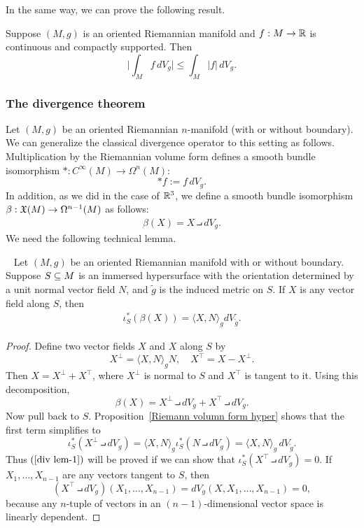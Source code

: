 In the same way, we can prove the following result.
\begin{proposition}
Suppose $(M,g)$ is an oriented Riemannian manifold and $f:M\to\mathbb{R}$ is continuous and compactly supported. Then
\[\Big|\int_Mf\,dV_g\Big|\leq\int_M|f|\,dV_g.\]
\end{proposition}
\subsubsection{The divergence theorem}
Let $(M,g)$ be an oriented Riemannian $n$-manifold (with or without boundary). We can generalize the classical divergence operator to this setting as follows. Multiplication by the Riemannian volume form defines a smooth bundle isomorphism $\ast:C^\infty(M)\to\Omega^n(M)$:
\[\ast f:=f\,dV_g.\]
In addition, as we did in the case of $\mathbb{R}^3$, we define a smooth bundle isomorphism $\beta:\mathfrak{X}(M)\to\Omega^{n-1}(M)$ as follows:
\begin{align}\label{int prod Riemann}
\beta(X)=X\intprod dV_g.
\end{align}
We need the following technical lemma.
\begin{lemma}~\label{divergence lemma}
Let $(M,g)$ be an oriented Riemannian manifold with or without boundary. Suppose $S\subseteq M$ is an immersed hypersurface with the orientation determined by a unit normal vector field $N$, and $\widetilde{g}$ is the induced metric on $S$. If $X$ is any vector field along $S$, then
\begin{align}\label{div lem-1}
\iota_S^*(\beta(X))=\langle X,N\rangle_gdV_{\widetilde{g}}.
\end{align}
\end{lemma}
\begin{proof}
Define two vector fields $X$ and $X$ along $S$ by
\[X^\bot=\langle X,N\rangle_gN,\quad X^\top=X-X^\bot.\]
Then $X=X^\bot+X^\top$, where $X^\bot$ is normal to $S$ and $X^\top$ is tangent to it. Using this decomposition,
\[\beta(X)=X^\bot\intprod dV_g+X^\top\intprod dV_g.\]
Now pull back to $S$. Proposition~\ref{Riemann volumn form hyper} shows that the first term simplifies to
\[\iota_S^*(X^\bot\intprod dV_g)=\langle X,N\rangle_g\iota_S^*(N\intprod dV_g)=\langle X,N\rangle_g\,dV_{\widetilde{g}}.\]
Thus $(\ref{div lem-1})$ will be proved if we can show that $\iota_S^*(X^\top\intprod dV_g)=0$. If $X_1,\dots,X_{n-1}$ are any vectors tangent to $S$, then
\[(X^\top\intprod dV_g)(X_1,\dots,X_{n-1})=dV_g(X,X_1,\dots,X_{n-1})=0,\]
because any $n$-tuple of vectors in an $(n-1)$-dimensional vector space is linearly
dependent.
\end{proof}
